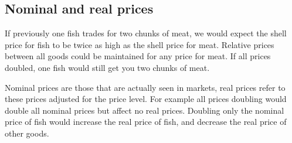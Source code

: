 
\subsection{Nominal and real prices}

If previously one fish trades for two chunks of meat, we would expect the shell price for fish to be twice as high as the shell price for meat. Relative prices between all goods could be maintained for any price for meat. If all prices doubled, one fish would still get you two chunks of meat.

Nominal prices are those that are actually seen in markets, real prices refer to these prices adjusted for the price level. For example all prices doubling would double all nominal prices but affect no real prices. Doubling only the nominal price of fish would increase the real price of fish, and decrease the real price of other goods.

